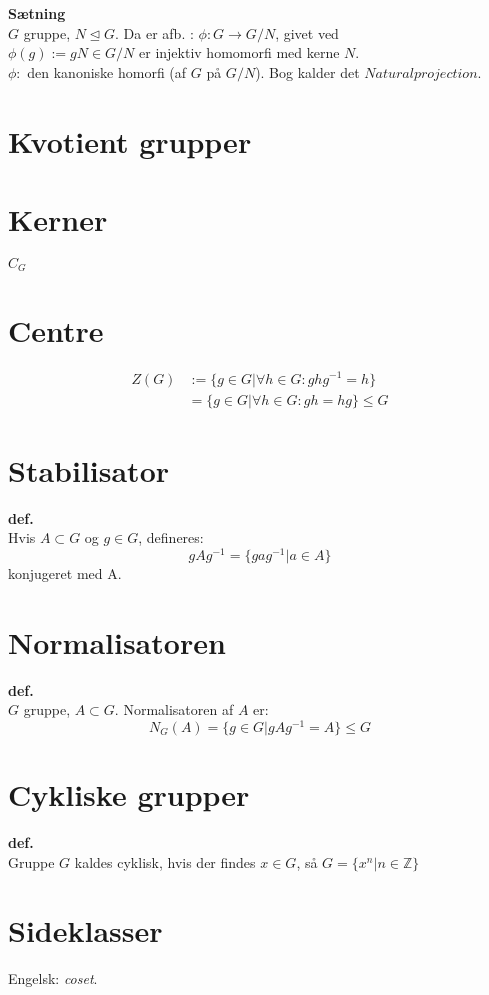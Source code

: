 \documentclass{article}
\begin{document}
\textbf{Sætning}\\
$G$ gruppe, $N \trianglelefteq G$. Da er afb. :
$\phi : G \to G/N$, givet ved\\
$\phi(g) := gN \in G/N$ er injektiv homomorfi med kerne $N$.\\
$\phi :$ den kanoniske homorfi (af $G$ på $G/N$).
Bog kalder det $Natural projection$.\\

\section*{Kvotient grupper}

\section*{Kerner}
$C_G$
\section*{Centre}

\begin{align*}
  Z(G) &:= \{ g \in G | \forall h \in G : g h g^{-1} = h \}\\
  &= \{ g \in G | \forall h \in G : gh = hg \} \leq G
\end{align*}
\section*{Stabilisator}
\textbf{def.}\\
Hvis $A \subset G$ og $g \in G$, defineres:\\
$$g A g^{-1} = \{ g a g^{-1} | a \in A\}$$
konjugeret med A.
\section*{Normalisatoren}
\textbf{def.}\\
$G$ gruppe, $A \subset G$. Normalisatoren af $A$ er:\\
$$N_G(A) = \{ g \in G | g A g^{-1} = A\} \leq G$$

\section*{Cykliske grupper}
\textbf{def.}\\
Gruppe $G$ kaldes cyklisk, hvis der findes
$x \in G$, så $G = \{ x^n | n \in \mathbb{Z} \}$

\section*{Sideklasser}
Engelsk: \textit{coset}.\\
\end{document}
